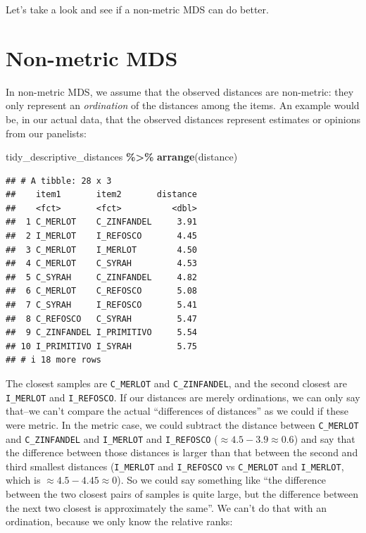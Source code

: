 \documentclass[
]{book}
\newenvironment{Shaded}{\begin{snugshade}}{\end{snugshade}}
\newcommand{\FunctionTok}[1]{\textcolor[rgb]{0.13,0.29,0.53}{\textbf{#1}}}
\newcommand{\NormalTok}[1]{#1}
\newcommand{\SpecialCharTok}[1]{\textcolor[rgb]{0.81,0.36,0.00}{\textbf{#1}}}
\begin{document}
Let's take a look and see if a non-metric MDS can do better.

\section{Non-metric MDS}\label{non-metric-mds}

In non-metric MDS, we assume that the observed distances are non-metric: they only represent an \emph{ordination} of the distances among the items. An example would be, in our actual data, that the observed distances represent estimates or opinions from our panelists:

\begin{Shaded}
\begin{Highlighting}[]
\NormalTok{tidy\_descriptive\_distances }\SpecialCharTok{\%\textgreater{}\%}
  \FunctionTok{arrange}\NormalTok{(distance)}
\end{Highlighting}
\end{Shaded}

\begin{verbatim}
## # A tibble: 28 x 3
##    item1       item2       distance
##    <fct>       <fct>          <dbl>
##  1 C_MERLOT    C_ZINFANDEL     3.91
##  2 I_MERLOT    I_REFOSCO       4.45
##  3 C_MERLOT    I_MERLOT        4.50
##  4 C_MERLOT    C_SYRAH         4.53
##  5 C_SYRAH     C_ZINFANDEL     4.82
##  6 C_MERLOT    C_REFOSCO       5.08
##  7 C_SYRAH     I_REFOSCO       5.41
##  8 C_REFOSCO   C_SYRAH         5.47
##  9 C_ZINFANDEL I_PRIMITIVO     5.54
## 10 I_PRIMITIVO I_SYRAH         5.75
## # i 18 more rows
\end{verbatim}

The closest samples are \texttt{C\_MERLOT} and \texttt{C\_ZINFANDEL}, and the second closest are \texttt{I\_MERLOT} and \texttt{I\_REFOSCO}. If our distances are merely ordinations, we can only say that--we can't compare the actual ``differences of distances'' as we could if these were metric. In the metric case, we could subtract the distance between \texttt{C\_MERLOT} and \texttt{C\_ZINFANDEL} and \texttt{I\_MERLOT} and \texttt{I\_REFOSCO} (\(\approx4.5-3.9\approx0.6\)) and say that the difference between those distances is larger than that between the second and third smallest distances (\texttt{I\_MERLOT} and \texttt{I\_REFOSCO} vs \texttt{C\_MERLOT} and \texttt{I\_MERLOT}, which is \(\approx4.5-4.45\approx0\)). So we could say something like ``the difference between the two closest pairs of samples is quite large, but the difference between the next two closest is approximately the same''. We can't do that with an ordination, because we only know the relative ranks:
\end{document}
